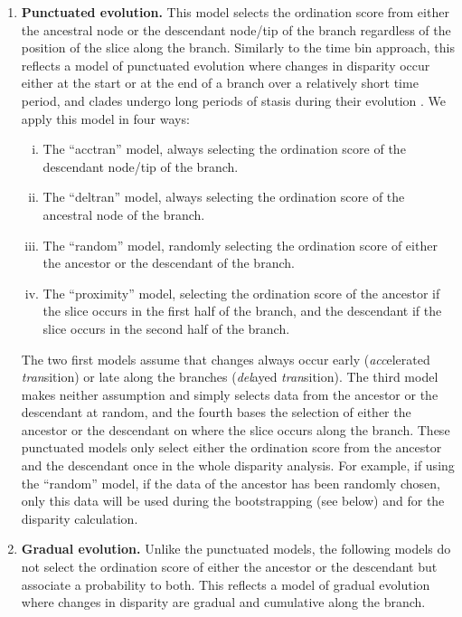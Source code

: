\documentclass[12pt,a4paper]{article}
\begin{document}
\begin{enumerate}

    \item{\textbf{Punctuated evolution.}} 
    This model selects the ordination score from either the ancestral node or the descendant node/tip of the branch regardless of the position of the slice along the branch. 
    Similarly to the time bin approach, this reflects a model of punctuated evolution where changes in disparity occur either at the start or at the end of a branch over a relatively short time period, and clades undergo long periods of stasis during their evolution \citep{Gould1977,Hunt20112007}.
    We apply this model in four ways: 

    \begin{enumerate}[(i)]

      \item The ``acctran'' model, always selecting the ordination score of the descendant node/tip of the branch.
      \item The ``deltran'' model, always selecting the ordination score of the ancestral node of the branch.
      \item The ``random'' model, randomly selecting the ordination score of either the ancestor or the descendant of the branch.
      \item The ``proximity'' model, selecting the ordination score of the ancestor if the slice occurs in the first half of the branch, and the descendant if the slice occurs in the second half of the branch.

    \end{enumerate}

    The two first models assume that changes always occur early (\textit{acc}elerated \textit{tran}sition) or late along the branches (\textit{del}ayed \textit{tran}sition).
    The third model makes neither assumption and simply selects data from the ancestor or the descendant at random, and the fourth bases the selection of either the ancestor or the descendant on where the slice occurs along the branch.
    These punctuated models only select either the ordination score from the ancestor and the descendant once in the whole disparity analysis.
    For example, if using the ``random'' model, if the data of the ancestor has been randomly chosen, only this data will be used during the bootstrapping (see below) and for the disparity calculation.
    
    \item{\textbf{Gradual evolution.}}
    Unlike the punctuated models, the following models do not select the ordination score of either the ancestor or the descendant but associate a probability to both.
    This reflects a model of gradual evolution where changes in disparity are gradual and cumulative along the branch.


\end{enumerate}
\end{document}

